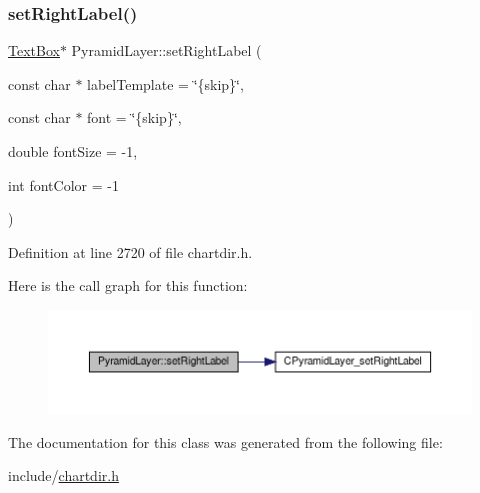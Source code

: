 \subsubsection{\texorpdfstring{set\+Right\+Label()}{setRightLabel()}}
{\footnotesize\ttfamily \hyperlink{class_text_box}{Text\+Box}$\ast$ Pyramid\+Layer\+::set\+Right\+Label (\begin{DoxyParamCaption}\item[{const char $\ast$}]{label\+Template = {\ttfamily \char`\"{}\{skip\}\char`\"{}},  }\item[{const char $\ast$}]{font = {\ttfamily \char`\"{}\{skip\}\char`\"{}},  }\item[{double}]{font\+Size = {\ttfamily -\/1},  }\item[{int}]{font\+Color = {\ttfamily -\/1} }\end{DoxyParamCaption})\hspace{0.3cm}{\ttfamily [inline]}}



Definition at line 2720 of file chartdir.\+h.

Here is the call graph for this function\+:
\nopagebreak
\begin{figure}[H]
\begin{center}
\leavevmode
\includegraphics[width=350pt]{class_pyramid_layer_ab9f1119330312a09c4a9b02681cdb955_cgraph}
\end{center}
\end{figure}


The documentation for this class was generated from the following file\+:\begin{DoxyCompactItemize}
\item 
include/\hyperlink{chartdir_8h}{chartdir.\+h}\end{DoxyCompactItemize}

